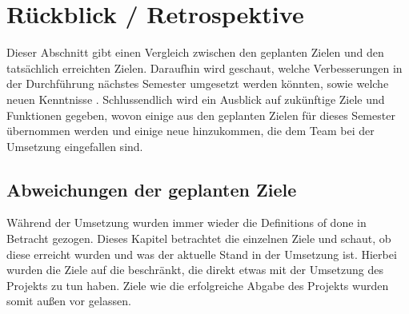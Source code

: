 \section{Rückblick / Retrospektive}\label{sec:rueckblick-retrospektive}

Dieser Abschnitt gibt einen Vergleich zwischen den geplanten Zielen und den tatsächlich erreichten Zielen.
Daraufhin wird geschaut, welche Verbesserungen in der Durchführung nächstes Semester umgesetzt werden könnten, sowie welche neuen Kenntnisse .
Schlussendlich wird ein Ausblick auf zukünftige Ziele und Funktionen gegeben, wovon einige aus den geplanten Zielen für dieses Semester übernommen werden und einige neue hinzukommen, die dem Team bei der Umsetzung eingefallen sind.

\subsection{Abweichungen der geplanten Ziele}\label{subsec:abweichungen-der-geplanten-ziele}
Während der Umsetzung wurden immer wieder die Definitions of done in Betracht gezogen.
Dieses Kapitel betrachtet die einzelnen Ziele und schaut, ob diese erreicht wurden und was der aktuelle Stand in der Umsetzung ist.
Hierbei wurden die Ziele auf die beschränkt, die direkt etwas mit der Umsetzung des Projekts zu tun haben.
Ziele wie die erfolgreiche Abgabe des Projekts wurden somit außen vor gelassen.

